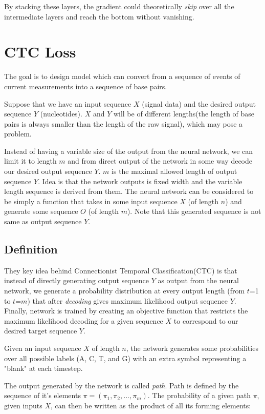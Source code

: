 \documentclass[times, utf8, diplomski, numeric, english]{fer}
\begin{document}
By stacking these layers, the gradient could theoretically \textit{skip} over all the intermediate layers and reach the bottom without vanishing.



\section{CTC Loss}

The goal is to design model which can convert from a sequence of events of current measurements into a sequence of base pairs.

Suppose that we have an input sequence $X$ (signal data) and the desired output sequence $Y$ (nucleotides). $X$ and $Y$ will be of different lengths(the length of base pairs is always smaller than the length of the raw signal), which may pose a problem.

Instead of having a variable size of the output from the neural network, we can limit it to length $m$ and from direct output of the network in some way decode our desired output sequence $Y$. $m$ is the maximal allowed length of output sequence $Y$.
Idea is that the network outputs is fixed width and the variable length sequence is derived from them.
The neural network can be considered to be simply a function that takes in some input sequence $X$ (of length $n$) and generate some sequence $O$ (of length $m$). Note that this generated sequence is not same as output sequence $Y$. 

\subsection{Definition}
They key idea behind Connectionist Temporal Classification(CTC)\cite{Graves:2006:CTC:1143844.1143891} is that instead of directly generating output sequence $Y$ as output from the neural network, we  generate a probability distribution at every output length (from $t$=1 to $t$=$m$) that after \textit{decoding} gives maximum likelihood output sequence $Y$. 
Finally, network is trained by creating an objective function that restricts the maximum likelihood decoding for a given sequence $X$ to correspond to our desired target sequence $Y$.


Given an input sequence $X$ of length $n$, the network generates some probabilities over all possible labels (A, C, T, and G) with an extra symbol representing a "blank" at each timestep. 

The output generated by the network is called \textit{path}. Path is defined by the sequence of it's elements $\pi = (\pi_1, \pi_2, ..., \pi_m)$.
The probability of a given path $\pi$, given inputs $X$, can then be written as the product of all its forming elements:
\end{document}
